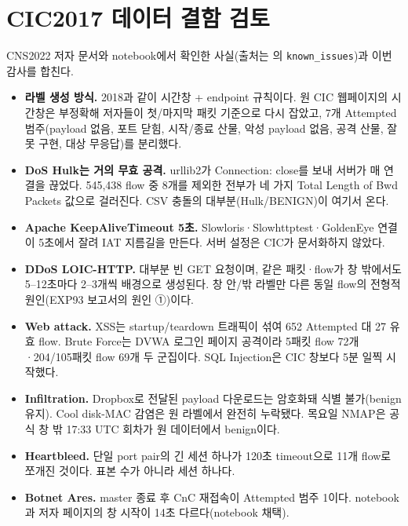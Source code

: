 
\section{CIC2017 데이터 결함 검토}
CNS2022 저자 문서와 notebook에서 확인한 사실(출처는 의 \texttt{known\_issues})과 이번 감사를 합친다.
\begin{itemize}
\item \textbf{라벨 생성 방식.} 2018과 같이 시간창 + endpoint 규칙이다. 원 CIC 웹페이지의 시간창은 부정확해 저자들이 첫/마지막 패킷 기준으로 다시 잡았고, 7개 Attempted 범주(payload 없음, 포트 닫힘, 시작/종료 산물, 악성 payload 없음, 공격 산물, 잘못 구현, 대상 무응답)를 분리했다.
\item \textbf{DoS Hulk는 거의 무효 공격.} urllib2가 Connection: close를 보내 서버가 매 연결을 끊었다. 545,438 flow 중 8개를 제외한 전부가 네 가지 Total Length of Bwd Packets 값으로 걸러진다. CSV 충돌의 대부분(Hulk/BENIGN)이 여기서 온다.
\item \textbf{Apache KeepAliveTimeout 5초.} Slowloris·Slowhttptest·GoldenEye 연결이 5초에서 잘려 IAT 지름길을 만든다. 서버 설정은 CIC가 문서화하지 않았다.
\item \textbf{DDoS LOIC-HTTP.} 대부분 빈 GET 요청이며, 같은 패킷·flow가 창 밖에서도 5--12초마다 2--3개씩 배경으로 생성된다. 창 안/밖 라벨만 다른 동일 flow의 전형적 원인(EXP93 보고서의 원인 ①)이다.
\item \textbf{Web attack.} XSS는 startup/teardown 트래픽이 섞여 652 Attempted 대 27 유효 flow. Brute Force는 DVWA 로그인 페이지 공격이라 5패킷 flow 72개·204/105패킷 flow 69개 두 군집이다. SQL Injection은 CIC 창보다 5분 일찍 시작했다.
\item \textbf{Infiltration.} Dropbox로 전달된 payload 다운로드는 암호화돼 식별 불가(benign 유지). Cool disk-MAC 감염은 원 라벨에서 완전히 누락됐다. 목요일 NMAP은 공식 창 밖 17:33 UTC 회차가 원 데이터에서 benign이다.
\item \textbf{Heartbleed.} 단일 port pair의 긴 세션 하나가 120초 timeout으로 11개 flow로 쪼개진 것이다. 표본 수가 아니라 세션 하나다.
\item \textbf{Botnet Ares.} master 종료 후 CnC 재접속이 Attempted 범주 1이다. notebook과 저자 페이지의 창 시작이 14초 다르다(notebook 채택).

\end{itemize}
